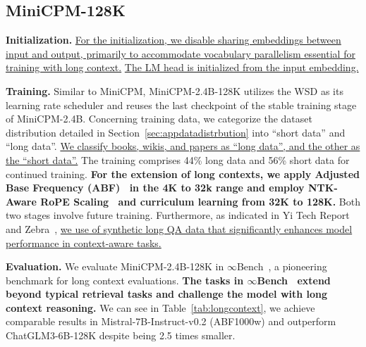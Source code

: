 \subsection{MiniCPM-128K}

\textbf{Initialization.}
\uline{For the initialization, we disable sharing embeddings between input and output, primarily to accommodate vocabulary parallelism essential for training with long context.} \uline{The LM head is initialized from the input embedding.}

\textbf{Training.}
Similar to MiniCPM, MiniCPM-2.4B-128K utilizes the WSD as its learning rate scheduler and reuses the last checkpoint of the stable training stage of MiniCPM-2.4B. Concerning training data, we categorize the dataset distribution detailed in Section~\ref{sec:appdatadistrbution} into ``short data'' and ``long data''. \uline{We classify books, wikis, and papers as ``long data'', and the other as the ``short data''.} The training comprises 44\% long data and 56\% short data for continued training. \textbf{For the extension of long contexts, we apply Adjusted Base Frequency (ABF)~\citep{xiong2023effective} in the 4K to 32k range and employ NTK-Aware RoPE Scaling~\citep{bloc97_2023_ntk} and curriculum learning from 32K to 128K.} Both two stages involve future training. Furthermore, as indicated in Yi Tech Report~\citep{young2024yi} and Zebra~\citep{song2023zebra}, \uline{we use of synthetic long QA data that significantly enhances model performance in context-aware tasks.}

\textbf{Evaluation.} We evaluate MiniCPM-2.4B-128K in $\infty$Bench~\citep{zhang2024infty}, a pioneering benchmark for long context evaluations. \textbf{The tasks in $\infty$Bench~\citep{zhang2024infty} extend beyond typical retrieval tasks and challenge the model with long context reasoning.} We can see in Table~\ref{tab:longcontext}, we achieve comparable results in Mistral-7B-Instruct-v0.2 (ABF1000w) and outperform ChatGLM3-6B-128K despite being 2.5 times smaller.